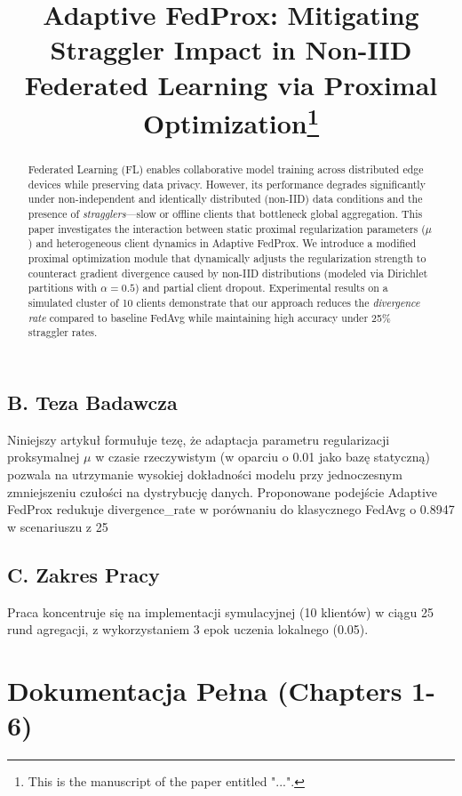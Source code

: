\documentclass[conference]{IEEEtran}
\begin{document}
\subsection*{B. Teza Badawcza}
Niniejszy artykuł formułuje tezę, że adaptacja parametru regularizacji proksymalnej $\mu$ w czasie rzeczywistym (w oparciu o 0.01 jako bazę statyczną) pozwala na utrzymanie wysokiej dokładności modelu przy jednoczesnym zmniejszeniu czułości na dystrybucję danych. Proponowane podejście Adaptive FedProx redukuje divergence\_rate w porównaniu do klasycznego FedAvg o 0.8947 w scenariuszu z 25\\%

\subsection*{C. Zakres Pracy}
Praca koncentruje się na implementacji symulacyjnej (10 klientów) w ciągu 25 rund agregacji, z wykorzystaniem 3 epok uczenia lokalnego (0.05).

\section{Dokumentacja Pełna (Chapters 1-6)}












\title{Adaptive FedProx: Mitigating Straggler Impact in Non-IID Federated Learning via Proximal Optimization\thanks{This is the manuscript of the paper entitled "...".}}

\author{}



\begin{abstract}
Federated Learning (FL) enables collaborative model training across distributed edge devices while preserving data privacy. However, its performance degrades significantly under non-independent and identically distributed (non-IID) data conditions and the presence of \textit{stragglers}—slow or offline clients that bottleneck global aggregation. This paper investigates the interaction between static proximal regularization parameters ($\mu$) and heterogeneous client dynamics in Adaptive FedProx. We introduce a modified proximal optimization module that dynamically adjusts the regularization strength to counteract gradient divergence caused by non-IID distributions (modeled via Dirichlet partitions with $\alpha = 0.5$) and partial client dropout. Experimental results on a simulated cluster of 10 clients demonstrate that our approach reduces the \textit{divergence rate} compared to baseline FedAvg while maintaining high accuracy under 25\% straggler rates.
\end{abstract}
\end{document}
